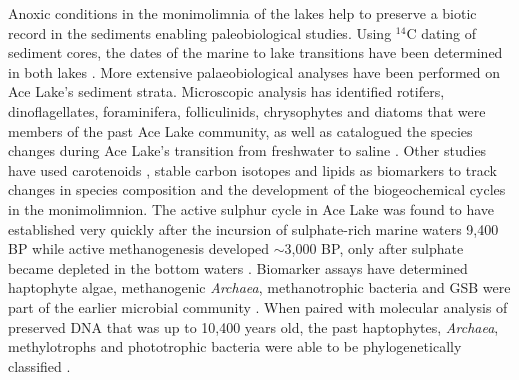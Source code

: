 Anoxic conditions in the monimolimnia of the lakes help to preserve a biotic record in the sediments enabling paleobiological studies.
Using $^{14}$C dating of sediment cores, the dates of the marine to lake transitions have been determined in both lakes \cite{Bird1991}.
More extensive palaeobiological analyses have been performed on Ace Lake's sediment strata.
Microscopic analysis has identified rotifers, dinoflagellates, foraminifera, folliculinids, chrysophytes and diatoms that were members of the past Ace Lake community, as well as catalogued the species changes during Ace Lake's transition from freshwater to saline \cite{Roberts1999, Swadling2001, Cromer2005}.
Other studies have used carotenoids \cite{Hopmans2005, Coolen2006}, stable carbon isotopes \cite{Schouten2001} and lipids \cite{Volkman1986, Volkman1988, Damste2001, Coolen2004a, Coolen2004b, Coolen2008} as biomarkers to track changes in species composition and the development of the biogeochemical cycles in the monimolimnion.
The active sulphur cycle in Ace Lake was found to have established very quickly after the incursion of sulphate-rich marine waters 9,400 BP while active methanogenesis developed $\sim$3,000 BP, only after sulphate became depleted in the bottom waters \cite{Coolen2004b, Coolen2006}.
Biomarker assays have determined haptophyte algae, methanogenic \emph{Archaea}, methanotrophic bacteria and \ac{GSB} were part of the earlier microbial community \cite{Schouten2001, Coolen2004a, Coolen2004b, Coolen2006, Coolen2008}.
When paired with molecular analysis of preserved \textsc{DNA} that was up to 10,400 years old, the past haptophytes, \emph{Archaea}, methylotrophs and phototrophic bacteria were able to be phylogenetically classified \cite{Coolen2004a, Coolen2004b, Coolen2006, Coolen2008}.

